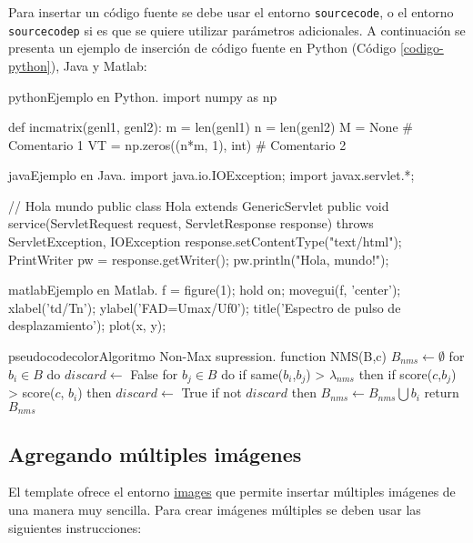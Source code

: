 	Para insertar un código fuente se debe usar el entorno \texttt{sourcecode}, o el entorno \texttt{sourcecodep} si es que se quiere utilizar parámetros adicionales. A continuación se presenta un ejemplo de inserción de código fuente en Python (Código \ref{codigo-python}), Java y Matlab:

\begin{sourcecode}[\label{codigo-python}]{python}{Ejemplo en Python.}
import numpy as np

def incmatrix(genl1, genl2):
	m = len(genl1)
	n = len(genl2)
	M = None # Comentario 1
	VT = np.zeros((n*m, 1), int) # Comentario 2
\end{sourcecode}

\begin{sourcecode}[]{java}{Ejemplo en Java.}
import java.io.IOException;
import javax.servlet.*;

// Hola mundo
public class Hola extends GenericServlet {
	public void service(ServletRequest request, ServletResponse response)
	throws ServletException, IOException{
		response.setContentType("text/html");
		PrintWriter pw = response.getWriter();
		pw.println("Hola, mundo!");
	}
}
\end{sourcecode}

\begin{sourcecode}{matlab}{Ejemplo en Matlab.}
f = figure(1); hold on;
movegui(f, 'center');
xlabel('td/Tn');
ylabel('FAD=Umax/Uf0');
title('Espectro de pulso de desplazamiento');
plot(x, y);
\end{sourcecode}

\begin{sourcecode}{pseudocodecolor}{Algoritmo Non-Max supression.}
function NMS(B,c)
	$B_{nms} \leftarrow \emptyset$
	for $b_i \in B$ do
		$discard \leftarrow$ False
		for $b_j \in B$ do
			if same($b_i$,$b_j$) > $\lambda_{nms}$ then
				if score($c$,$b_j$) > score($c$, $b_i$) then
					$discard \leftarrow$ True
		if not $discard$ then
			$B_{nms} \leftarrow B_{nms} \bigcup b_i$
	return $B_{nms}$
\end{sourcecode}

\subsection{Agregando múltiples imágenes}

	El template ofrece el entorno \href{https://latex.ppizarror.com/informe.html#hlp-images}{images} que permite insertar múltiples imágenes de una manera muy sencilla. Para crear imágenes múltiples se deben usar las siguientes instrucciones:

